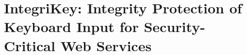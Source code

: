 \chapter[IntegriKey]{IntegriKey: Integrity Protection of Keyboard Input for Security-Critical Web Services}
\label{ch:integrikey}














